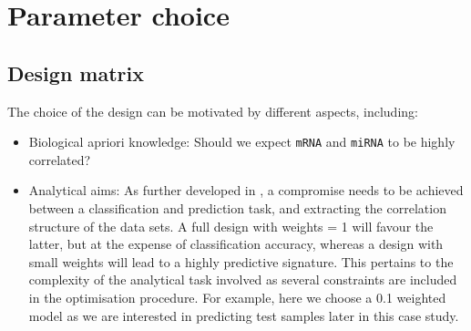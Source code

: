 \documentclass[
]{book}
\newenvironment{Shaded}{\begin{snugshade}}{\end{snugshade}}
\newcommand{\AttributeTok}[1]{\textcolor[rgb]{0.77,0.63,0.00}{#1}}
\newcommand{\CommentTok}[1]{\textcolor[rgb]{0.56,0.35,0.01}{\textit{#1}}}
\newcommand{\FunctionTok}[1]{\textcolor[rgb]{0.00,0.00,0.00}{#1}}
\newcommand{\NormalTok}[1]{#1}
\newcommand{\OtherTok}[1]{\textcolor[rgb]{0.56,0.35,0.01}{#1}}
\newcommand{\SpecialCharTok}[1]{\textcolor[rgb]{0.00,0.00,0.00}{#1}}
\begin{document}
\begin{Shaded}
\end{Shaded}

\hypertarget{parameter-choice}{%
\section{Parameter choice}\label{parameter-choice}}

\hypertarget{diablo:design}{%
\subsection{Design matrix}\label{diablo:design}}

The choice of the design can be motivated by different aspects, including:

\begin{itemize}
\item
  Biological apriori knowledge: Should we expect \texttt{mRNA} and \texttt{miRNA} to be highly correlated?
\item
  Analytical aims: As further developed in \citet{Sin19}, a compromise needs to be achieved between a classification and prediction task, and extracting the correlation structure of the data sets. A full design with weights = 1 will favour the latter, but at the expense of classification accuracy, whereas a design with small weights will lead to a highly predictive signature. This pertains to the complexity of the analytical task involved as several constraints are included in the optimisation procedure. For example, here we choose a 0.1 weighted model as we are interested in predicting test samples later in this case study.
\end{itemize}
\end{document}
